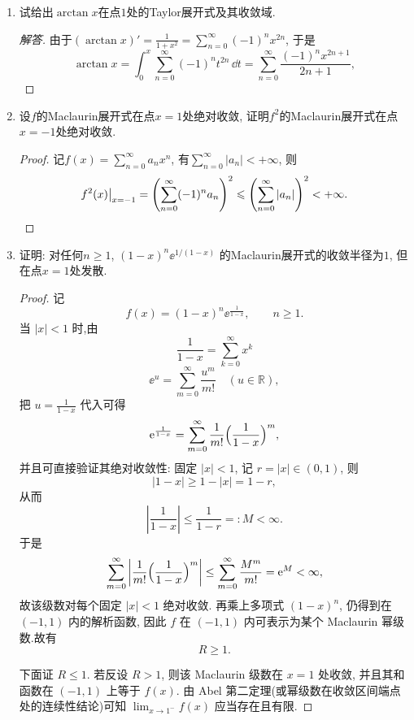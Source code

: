 \begin{quiza}
\begin{enumerate}
\begin{proof}[解答]
记 \(\sum_{m=0}^{\infty}c_mx^m\), 其中
\[c_{2n}=0,\qquad c_{2n+1}=(-1)^n\frac{\binom{2n}{n}}{4^n(2n+1)}.\]
由 \(\binom{2n}{n}\sim\frac{4^n}{\sqrt{\pi n}}\) 得
\[|c_{2n+1}|\sim \frac{1}{2\sqrt\pi\,n^{3/2}},\]
故
\[\varlimsup_{m\to\infty}\sqrt[m]{|c_m|}=1,\]
从而由 Cauchy-Hadamard 公式得收敛半径 \(R=1\). 又因
\[\sum_{n=0}^{\infty}\left|\frac{\binom{2n}{n}}{4^n(2n+1)}\right|\]
与 \(\sum n^{-3/2}\) 比较收敛, 故在 \(x=\pm1\) 处绝对收敛. 因而收敛域为 \([-1,1]\).
\end{proof}
\item 试给出\(\arctan x\)在点\(1\)处的Taylor展开式及其收敛域.
\begin{proof}[解答]
由于\(\left(\arctan x\right)'=\frac{1}{1+x^2}=\sum_{n=0}^{\infty}(-1)^nx^{2n}\), 
于是\[\arctan x=\int_{0}^{x}\sum_{n=0}^{\infty}(-1)^nt^{2n}\,\dd t
=\sum_{n=0}^{\infty}\frac{(-1)^{n}x^{2n+1}}{2n+1},\]
\end{proof}
\item 设\(f\)的Maclaurin展开式在点\(x=1\)处绝对收敛, 
证明\(f^2\)的Maclaurin展开式在点\(x=-1\)处绝对收敛.
\begin{proof}
记\(f(x)=\sum_{n=0}^{\infty}a_nx^n\), 有\(\sum_{n=0}^{\infty}\left|a_n\right|<+\infty\), 则
\[f^2(x)\big|_{x=-1}=\left(\sum_{n=0}^{\infty}(-1)^na_n\right)^2
\leqslant\left(\sum_{n=0}^{\infty}|a_n|\right)^2<+\infty.\qedhere\]
\end{proof}
\item 证明: 对任何\(n\geqslant 1\), \((1-x)^n\ee^{1/(1-x)}\)
的Maclaurin展开式的收敛半径为\(1\), 但在点\(x=1\)处发散.
\begin{proof}
记
\[f(x)=(1-x)^n\ee^{\frac{1}{1-x}},\qquad n\ge1.\]
当 \(|x|<1\) 时,由
\[\frac{1}{1-x}=\sum_{k=0}^{\infty}x^k\]
\[\ee^u=\sum_{m=0}^{\infty}\frac{u^m}{m!}\quad(u\in\mathbb R),\]
把 \(u=\frac{1}{1-x}\) 代入可得
\[\mathrm{e}^{\frac{1}{1-x}}=\sum_{m=0}^{\infty}\frac1{m!}\Bigl(\frac{1}{1-x}\Bigr)^m,\]
并且可直接验证其绝对收敛性: 固定 \(|x|<1\), 记 \(r=|x|\in(0,1)\), 则
\[|1-x|\ge 1-|x|=1-r,\]
从而
\[\left|\frac{1}{1-x}\right|\le\frac{1}{1-r}=:M<\infty.\]
于是
\[\sum_{m=0}^{\infty}\left|\frac1{m!}\Bigl(\frac{1}{1-x}\Bigr)^m\right|
\le \sum_{m=0}^{\infty}\frac{M^m}{m!}
=\mathrm{e}^M<\infty,\]
故该级数对每个固定 \(|x|<1\) 绝对收敛. 再乘上多项式 \((1-x)^n\), 仍得到在 \((-1,1)\) 内的解析函数,
因此 \(f\) 在 \((-1,1)\) 内可表示为某个 Maclaurin 幂级数.故有
\[R\ge1.\]

下面证 \(R\le1\). 若反设 \(R>1\), 则该 Maclaurin 级数在 \(x=1\) 处收敛, 并且其和函数在
\((-1,1)\) 上等于 \(f(x)\). 由 Abel 第二定理(或幂级数在收敛区间端点处的连续性结论)可知
\(\lim_{x\to1^-}f(x)\)
应当存在且有限.


\end{proof}
\end{enumerate}
\end{quiza}
